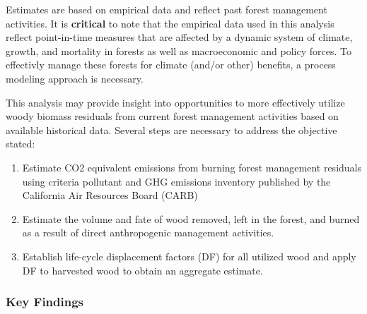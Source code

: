 \documentclass[a4paper]{article}
\begin{document}
Estimates are based on empirical data and reflect past forest
management activities. It is \textbf{critical} to note that the empirical
data used in this analysis reflect point-in-time measures that are
affected by a dynamic system of climate, growth, and mortality in
forests as well as macroeconomic and policy forces. To effectivly
manage these forests for climate (and/or other) benefits, a process modeling
approach is necessary. 

This analysis may provide insight into
opportunities to more effectively utilize woody biomass residuals from
current forest management activities based on available historical
data. Several steps are necessary to address the objective stated:

\begin{enumerate}
\item Estimate CO2 equivalent emissions from burning forest management
residuals using criteria pollutant and GHG emissions inventory
published by the California Air Resources Board (CARB)

\item Estimate the volume and fate of wood removed, left in the
forest, and burned as a result of direct anthropogenic management
activities.

\item Establish life-cycle displacement factors (DF) for all
utilized wood and apply DF to harvested wood to obtain an aggregate estimate.
\end{enumerate}

\subsubsection{Key Findings}
\label{sec-1-1-1}
\end{document}

